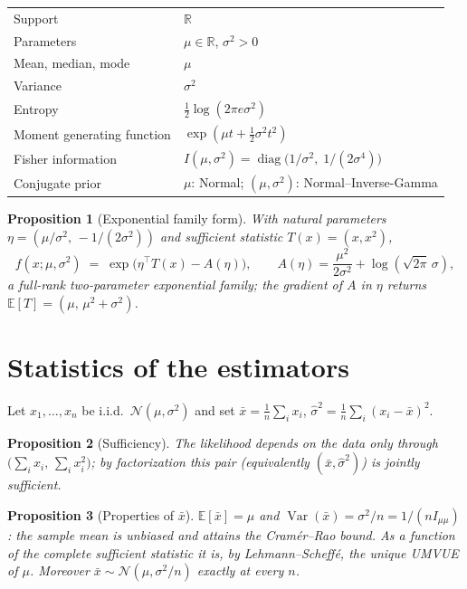 \documentclass[11pt]{article}
\newtheorem{proposition}{Proposition}
\theoremstyle{remark}
\newcommand{\E}{\mathbb{E}}
\newcommand{\Var}{\operatorname{Var}}
\newcommand{\xbar}{\bar{x}}
\begin{document}
\begin{center}
\begin{tabular}{ll}
\toprule
Support & $\mathbb{R}$\\
Parameters & $\mu \in \mathbb{R}$, $\sigma^2 > 0$\\
Mean, median, mode & $\mu$\\
Variance & $\sigma^2$\\
Entropy & $\tfrac12 \log(2\pi e \sigma^2)$\\
Moment generating function & $\exp(\mu t + \tfrac12 \sigma^2 t^2)$\\
Fisher information & $I(\mu, \sigma^2) =
  \operatorname{diag}\bigl(1/\sigma^2,\; 1/(2\sigma^4)\bigr)$\\
Conjugate prior & $\mu$: Normal; $(\mu, \sigma^2)$:
  Normal--Inverse-Gamma\\
\bottomrule
\end{tabular}
\end{center}

\begin{proposition}[Exponential family form]
\label{prop:expfam}
With natural parameters $\eta = (\mu/\sigma^2,\, -1/(2\sigma^2))$ and
sufficient statistic $T(x) = (x, x^2)$,
\begin{equation}
  f(x; \mu, \sigma^2)
  \;=\; \exp\bigl(\eta^{\!\top} T(x) - A(\eta)\bigr),
  \qquad
  A(\eta) = \frac{\mu^2}{2\sigma^2} + \log(\sqrt{2\pi}\,\sigma),
\end{equation}
a full-rank two-parameter exponential family; the gradient of $A$ in
$\eta$ returns $\E[T] = (\mu,\, \mu^2 + \sigma^2)$.
\end{proposition}

\section{Statistics of the estimators}

Let $x_1, \dots, x_n$ be i.i.d.\ $\mathcal{N}(\mu, \sigma^2)$ and set
$\xbar = \tfrac1n \sum_i x_i$,
$\hat\sigma^2 = \tfrac1n \sum_i (x_i - \xbar)^2$.

\begin{proposition}[Sufficiency]
The likelihood depends on the data only through
$\bigl(\sum_i x_i,\, \sum_i x_i^2\bigr)$; by factorization this pair
(equivalently $(\xbar, \hat\sigma^2)$) is jointly sufficient.
\end{proposition}

\begin{proposition}[Properties of $\xbar$]
$\E[\xbar] = \mu$ and $\Var(\xbar) = \sigma^2/n = 1/(n I_{\mu\mu})$:
the sample mean is unbiased and attains the Cram\'er--Rao bound. As a
function of the complete sufficient statistic it is, by
Lehmann--Scheff\'e, the unique UMVUE of $\mu$. Moreover
$\xbar \sim \mathcal{N}(\mu, \sigma^2/n)$ \emph{exactly} at every $n$.
\end{proposition}
\end{document}
